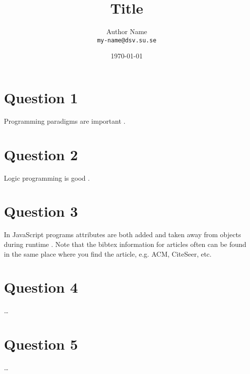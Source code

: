 \documentclass[a4paper,10pt]{article}
\title{Title}
\author{Author Name \\ 
  \texttt{my-name@dsv.su.se}}
\date{\today}
\begin{document}
\maketitle

\section{Question 1}

Programming paradigms are important \cite{sebesta}.

\section{Question 2}

Logic programming is good \cite{lecture_notes}.

\section{Question 3}

In JavaScript programs attributes are both added and taken away
from objects during runtime
\cite{Richards:2010:ADB:1806596.1806598}. Note that the bibtex
information for articles often can be found in the same place
where you find the article, e.g. ACM, CiteSeer, etc.

\section{Question 4}

\ldots

\section{Question 5}

\ldots


\small\raggedright

\end{document}
